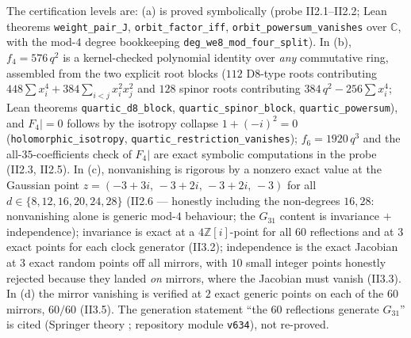 \documentclass[11pt,a4paper]{article}
\theoremstyle{remark}
\newcommand{\Z}{\mathbb Z}
\newcommand{\C}{\mathbb C}
\begin{document}
The certification levels are: (a) is proved symbolically (probe
II2.1--II2.2; Lean theorems \texttt{weight\_pair\_J},
\texttt{orbit\_factor\_iff}, \texttt{orbit\_powersum\_vanishes} over
$\C$, with the mod-$4$ degree bookkeeping
\texttt{deg\_we8\_mod\_four\_split}).  In (b), $f_4=576\,q^2$ is a
kernel-checked polynomial identity over \emph{any} commutative ring,
assembled from the two explicit root blocks ($112$ D8-type roots
contributing $448\sum x_i^4+384\sum_{i<j}x_i^2x_j^2$ and $128$ spinor
roots contributing $384\,q^2-256\sum x_i^4$; Lean theorems
\texttt{quartic\_d8\_block}, \texttt{quartic\_spinor\_block},
\texttt{quartic\_powersum}), and $F_4|=0$ follows by the isotropy
collapse $1+(-i)^2=0$ (\texttt{holomorphic\_isotropy},
\texttt{quartic\_restriction\_vanishes}); $f_6=1920\,q^3$ and the
all-$35$-coefficients check of $F_4|$ are exact symbolic computations
in the probe (II2.3, II2.5).  In (c), nonvanishing is rigorous by a
nonzero exact value at the Gaussian point
$z=(-3+3i,\,-3+2i,\,-3+2i,\,-3)$ for all
$d\in\{8,12,16,20,24,28\}$ (II2.6 --- honestly including the
non-degrees $16,28$: nonvanishing alone is generic mod-$4$ behaviour;
the $G_{31}$ content is invariance $+$ independence); invariance is
exact at a $4\Z[i]$-point for all $60$ reflections and at $3$ exact
points for each clock generator (II3.2); independence is the exact
Jacobian at $3$ exact random points off all mirrors, with $10$ small
integer points honestly rejected because they landed \emph{on}
mirrors, where the Jacobian must vanish (II3.3).  In (d) the mirror
vanishing is verified at $2$ exact generic points on each of the
$60$ mirrors, $60/60$ (II3.5).  The generation statement ``the $60$
reflections generate $G_{31}$'' is cited (Springer theory
\cite{Spr74,LT09}; repository module \texttt{v634}), not re-proved.
\end{document}
